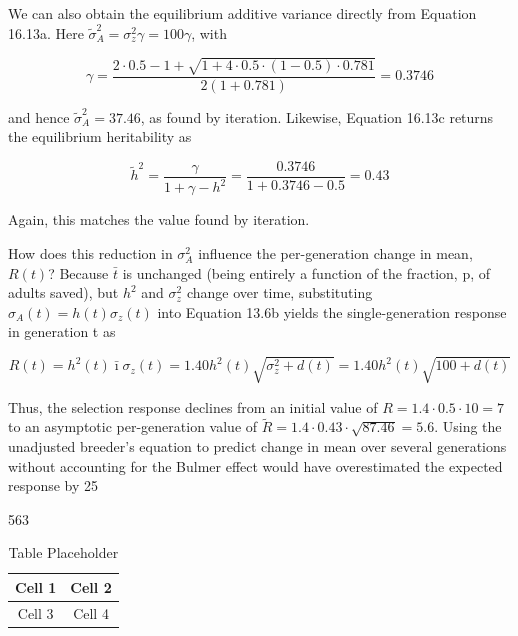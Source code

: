 \documentclass{article}
\begin{document}
We can also obtain the equilibrium additive variance directly from Equation 16.13a. Here  $ \widetilde{\sigma}_{A}^{2} = \sigma_{z}^{2} \gamma = 100 \gamma $, with

\begin{equation}
\gamma=\frac{2\cdot0.5-1+\sqrt{1+4\cdot0.5\cdot(1-0.5)\cdot0.781}}{2(1+0.781)}=0.3746
\end{equation}

and hence  $ \widetilde{\sigma}_{A}^{2}=37.46 $, as found by iteration. Likewise, Equation 16.13c returns the equilibrium heritability as

\begin{equation}
\tilde{h}^{2}=\frac{\gamma}{1+\gamma-h^{2}}=\frac{0.3746}{1+0.3746-0.5}=0.43
\end{equation}

Again, this matches the value found by iteration.

How does this reduction in  $ \sigma_A^2 $ influence the per-generation change in mean,  $ R(t) $? Because  $ \bar{t} $ is unchanged (being entirely a function of the fraction, p, of adults saved), but  $ h^2 $ and  $ \sigma_z^2 $ change over time, substituting  $ \sigma_A(t) = h(t)\sigma_z(t) $ into Equation 13.6b yields the single-generation response in generation t as

\begin{equation}
R(t)=h^{2}(t)\bar{\imath}\sigma_{z}(t)=1.40h^{2}(t)\sqrt{\sigma_{z}^{2}+d(t)}=1.40h^{2}(t)\sqrt{100+d(t)}
\end{equation}

Thus, the selection response declines from an initial value of  $ R = 1.4 \cdot 0.5 \cdot 10 = 7 $ to an asymptotic per-generation value of  $ \widetilde{R} = 1.4 \cdot 0.43 \cdot \sqrt{87.46} = 5.6 $. Using the unadjusted breeder's equation to predict change in mean over several generations without accounting for the Bulmer effect would have overestimated the expected response by 25%

563

\begin{table}[h]
\centering
\begin{tabular}{|c|c|}
\hline
Cell 1 & Cell 2 \\
\hline
Cell 3 & Cell 4 \\
\hline
\end{tabular}
\caption{Table Placeholder}
\end{table}
\end{document}
